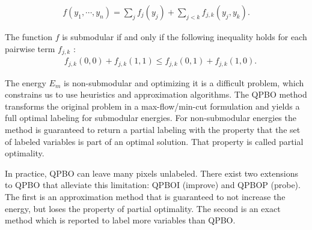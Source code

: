 \begin{align*}
f(y_1,\cdots, y_n) = \sum_{j}{f_j(y_j)} + \sum_{j < k}{f_{j,k}(y_j,y_k)}.
\end{align*}

The function $f$ is submodular if and only if the following inequality holds for each pairwise term $f_{j,k}$ \cite{kolmogorov04whatenergies}:
\begin{align*}
  \quad f_{j,k}(0,0) + f_{j,k}(1,1) \leq f_{j,k}(0,1) + f_{j,k}(1,0).
\end{align*}

The energy $E_m$ is non-submodular and optimizing it is a difficult problem, which constrains us to use heuristics and
approximation algorithms. The QPBO method \cite{rother07qpbo} transforms the original problem in a max-flow/min-cut
formulation and yields a full optimal labeling for submodular energies. For non-submodular energies the method is
guaranteed to return a partial labeling with the property that the set of labeled variables is part of an optimal
solution. That property is called partial optimality.

In practice, QPBO can leave many pixels unlabeled. There exist two extensions to QPBO that alleviate this limitation:
QPBOI (improve) and QPBOP (probe). The first is an approximation method that is guaranteed to not increase the energy,
but loses the property of partial optimality. The second is an exact method which is reported to label more variables
than QPBO.

